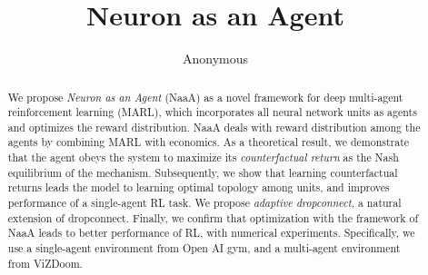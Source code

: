 \documentclass{article} %
\title{Neuron as an Agent}
\author{Anonymous}
\begin{document}
\maketitle

\begin{abstract}
We propose {\em Neuron as an Agent} (NaaA) as a novel framework for deep multi-agent reinforcement learning (MARL),
which incorporates all neural network units as agents and optimizes the reward distribution. %
NaaA deals with reward distribution among the agents by combining MARL with economics.
As a theoretical result, we demonstrate that the agent obeys the system to maximize its {\em counterfactual return} as the Nash equilibrium of the mechanism.
Subsequently, we show that learning counterfactual returns leads the model to learning optimal topology among units, and improves performance of a single-agent RL task.
We propose {\em adaptive dropconnect}, a natural extension of dropconnect.
Finally, we confirm that optimization with the framework of NaaA leads to better performance of RL, with numerical experiments.
Specifically, we use a single-agent environment from Open AI gym, and a multi-agent environment from ViZDoom.
\end{abstract}


%











\end{document}
